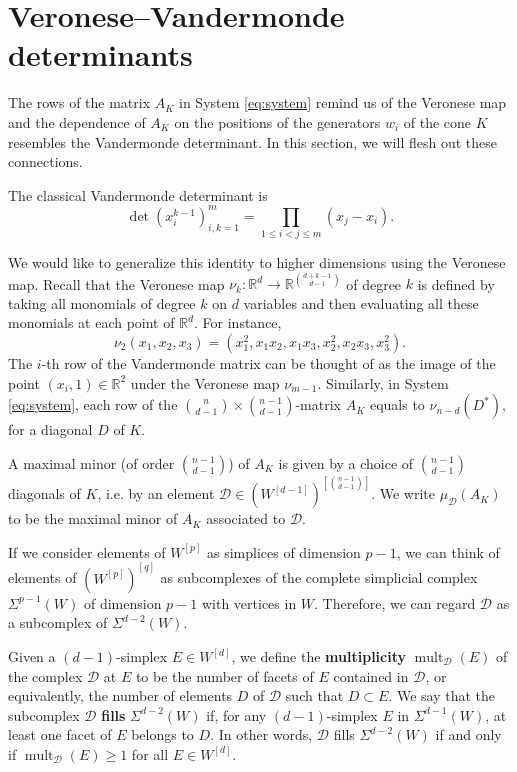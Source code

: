 \documentclass{article}
\DeclareMathOperator{\mult}{mult}
\begin{document}
\section{Veronese--Vandermonde determinants}
The rows of the matrix $A_K$ in System \ref{eq:system} remind us of the Veronese map and the dependence of $A_K$ on the positions of the generators $w_i$ of the cone $K$ resembles the Vandermonde determinant. In this section, we will flesh out these connections.

The classical Vandermonde determinant is 
\begin{equation}
	\det \left(x_i^{k-1} \right)_{i,k = 1}^m = \prod_{1 \leq i < j \leq m} (x_j - x_i).
\end{equation} 

We would like to generalize this identity to higher dimensions using the Veronese map. Recall that the Veronese map $\nu_k:\mathbb{R}^d \to \mathbb{R}^{\binom{d+k-1}{d-1}}$ of degree $k$ is defined by taking all monomials of degree $k$ on $d$ variables and then evaluating all these monomials at each point of $\mathbb{R}^d$. For instance,
\[ \nu_2 (x_1, x_2, x_3) = (x_1^2, x_1 x_2, x_1 x_3, x_2^2, x_2 x_3, x_3^2). \]
The $i$-th row of the Vandermonde matrix can be thought of as the image of the point $(x_i,1) \in \mathbb{R}^2$ under the Veronese map $\nu_{m-1}$. Similarly, in System \ref{eq:system}, each row of the $\binom{n}{d-1} \times \binom{n-1}{d-1}$-matrix $A_K$ equals to $\nu_{n-d}(D^*)$, for a diagonal $D$ of $K$.

A maximal minor (of order $\binom{n-1}{d-1}$) of $A_K$ is given by a choice of $\binom{n-1}{d-1}$ diagonals of $K$, i.e. by an element $\mathcal{D} \in \left(W^{[d-1]}\right)^{[\binom{n-1}{d-1}]}$. We write $\mu_\mathcal{D}(A_K)$ to be the maximal minor of $A_K$ associated to $\mathcal{D}$.

If we consider elements of $W^{[p]}$ as simplices of dimension $p-1$, we can think of elements of $\left(W^{[p]}\right)^{[q]}$ as subcomplexes of the complete simplicial complex $\Sigma^{p-1}(W)$ of dimension $p-1$ with vertices in $W$. Therefore, we can regard $\mathcal{D}$ as a subcomplex of $\Sigma^{d-2}(W)$. 

Given a $(d-1)$-simplex $E \in W^{[d]}$, we define the \textbf{multiplicity} $\mult_\mathcal{D} (E)$ of the complex $\mathcal{D}$ at $E$ to be the number of facets of $E$ contained in $\mathcal{D}$, or equivalently, the number of elements $D$ of $\mathcal{D}$ such that $D \subset E$. We say that the subcomplex $\mathcal{D}$ \textbf{fills} $\Sigma^{d-2}(W)$ if, for any $(d-1)$-simplex $E$ in $\Sigma^{d-1}(W)$, at least one facet of $E$ belongs to $D$. In other words, $\mathcal{D}$ fills $\Sigma^{d-2}(W)$ if and only if $\mult_\mathcal{D} (E) \geq 1$ for all $E \in W^{[d]}$. 
\end{document}
